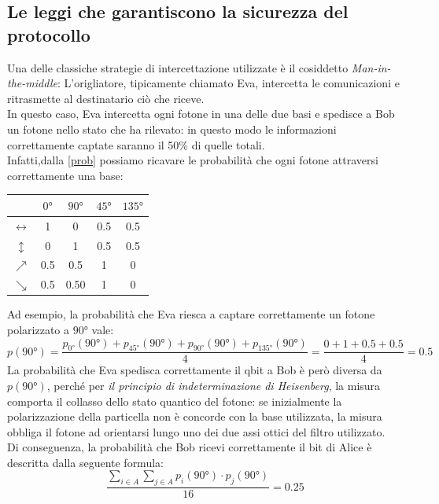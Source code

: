 \documentclass[italian,A4,12pt]{article}
\begin{document}
    \subsection{Le leggi che garantiscono la sicurezza del protocollo}
    Una delle classiche strategie di intercettazione utilizzate è il cosiddetto \textit{Man-in-the-middle}: L'origliatore, tipicamente chiamato Eva, intercetta le comunicazioni e ritrasmette al destinatario ciò che riceve.\\
    In questo caso, Eva intercetta ogni fotone in una delle due basi e spedisce a Bob un fotone nello stato che ha rilevato:
    in questo modo le informazioni correttamente captate saranno il 50\% di quelle totali.\\
    Infatti,dalla \eqref{prob} possiamo ricavare le probabilità che ogni fotone attraversi correttamente una base:
    \begin{center}
      \begin{tabular}{|c|c|c|c|c|}
        \hline
        &$\ang{0}$&$\ang{90}$&$\ang{45}$&$\ang{135}$\\
        \hline
        $\leftrightarrow$&1&0&0.5&0.5\\
        \hline
        $\updownarrow$&0&1&0.5&0.5\\
        \hline
        $\nearrow$&0.5&0.5&1&0\\
        \hline
        $\searrow$&0.5&0.50&1&0\\
        \hline
      \end{tabular}
    \end{center}
    Ad esempio, la probabilità che Eva riesca a captare correttamente un fotone polarizzato a $\ang{90}$ vale:
    $$p(\ang{90})=\frac{p_{\ang{0}}(\ang{90})+p_{\ang{45}}(\ang{90})+p_{\ang{90}}(\ang{90})+p_{\ang{135}}(\ang{90})}{4}=\frac{0+1+0.5+0.5}{4}=0.5$$
    La probabilità che Eva spedisca correttamente il qbit a Bob è però diversa da $p(\ang{90})$, perché per \textit{il principio di indeterminazione di Heisenberg}, la misura comporta il collasso dello stato quantico del fotone: se inizialmente la polarizzazione della particella non è concorde con la base utilizzata, la misura obbliga il fotone ad orientarsi lungo uno dei due assi ottici del filtro utilizzato.\\
    Di conseguenza, la probabilità che Bob ricevi correttamente il bit di Alice è descritta dalla seguente formula:
    \begin{equation*}
      \frac{\displaystyle\sum_{i\in A}\displaystyle\sum_{j\in A} p_i(\ang{90})\cdot p_j(\ang{90})}{16}=0.25
    \end{equation*}
\end{document}

